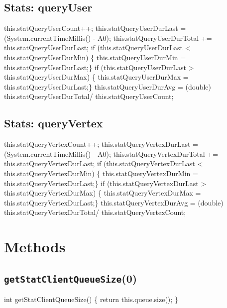 \subsection{Stats: queryUser}
\nwenddocs{}\endmoddef{}
    this.statQueryUserCount++;
    this.statQueryUserDurLast = (System.currentTimeMillis() - A0);
    this.statQueryUserDurTotal +=
    this.statQueryUserDurLast;
if (this.statQueryUserDurLast <
    this.statQueryUserDurMin) \{
    this.statQueryUserDurMin =
    this.statQueryUserDurLast;\}
if (this.statQueryUserDurLast >
    this.statQueryUserDurMax) \{
    this.statQueryUserDurMax =
    this.statQueryUserDurLast;\}
    this.statQueryUserDurAvg = (double)
    this.statQueryUserDurTotal/
    this.statQueryUserCount;
\nwendcode{}\nwdocspar

\subsection{Stats: queryVertex}
\nwenddocs{}\endmoddef{}
    this.statQueryVertexCount++;
    this.statQueryVertexDurLast = (System.currentTimeMillis() - A0);
    this.statQueryVertexDurTotal +=
    this.statQueryVertexDurLast;
if (this.statQueryVertexDurLast <
    this.statQueryVertexDurMin) \{
    this.statQueryVertexDurMin =
    this.statQueryVertexDurLast;\}
if (this.statQueryVertexDurLast >
    this.statQueryVertexDurMax) \{
    this.statQueryVertexDurMax =
    this.statQueryVertexDurLast;\}
    this.statQueryVertexDurAvg = (double)
    this.statQueryVertexDurTotal/
    this.statQueryVertexCount;
\nwendcode{}\nwdocspar

\section{Methods}
\subsection{\texttt{getStatClientQueueSize}(0)}
\nwenddocs{}\endmoddef{}
int getStatClientQueueSize() \{
  return this.queue.size();
\}
\eatline
{}\nwendcode{}\nwdocspar
